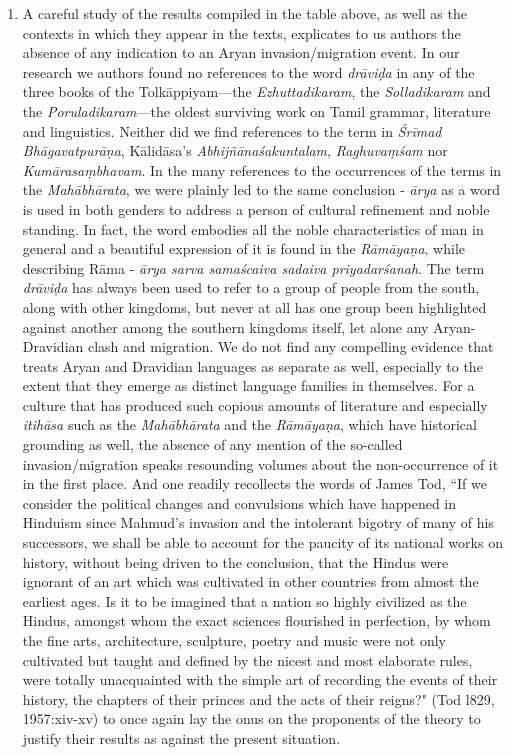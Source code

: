 \begin{enumerate}
\itemsep=0pt
\item A careful study of the results compiled in the table above, as well as the contexts in which they appear in the texts, explicates to us authors the absence of any indication to an Aryan invasion/migration event. In our research we authors found no references to the word \textit{drāviḍa} in any of the three books of the Tolkāppiyam—the \textit{Ezhuttadikaram}, the \textit{Solladikaram} and the \textit{Poruladikaram}—the oldest surviving work on Tamil grammar, literature and linguistics. Neither did we find references to the term in \textit{Śrīmad Bhāgavatpurāṇa}, Kālidāsa’s \textit{Abhijñānaśakuntalam}, \textit{Raghuvaṃśam} nor \textit{Kumārasaṃbhavam}. In the many references to the occurrences of the terms in the \textit{Mahābhārata}, we were plainly led to the same conclusion - \textit{ārya} as a word is used in both genders to address a person of cultural refinement and noble standing. In fact, the word embodies all the noble characteristics of man in general and a beautiful expression of it is found in the \textit{Rāmāyaṇa}, while describing Rāma -\textit{ ārya sarva samaścaiva sadaiva priyadarśanah}. The term \textit{drāviḍa} has always been used to refer to a group of people from the south, along with other kingdoms, but never at all has one group been highlighted against another among the southern kingdoms itself, let alone any Aryan-Dravidian clash and migration. We do not find any compelling evidence that treats Aryan and Dravidian languages as separate as well, especially to the extent that they emerge as distinct language families in themselves. For a culture that has produced such copious amounts of literature and especially \textit{itihāsa} such as the \textit{Mahābhārata} and the \textit{Rāmāyaṇa}, which have historical grounding as well, the absence of any mention of the so-called invasion/migration speaks resounding volumes about the non-occurrence of it in the first place. And one readily recollects the words of James Tod, “If we consider the political changes and convulsions which have happened in Hinduism since Mahmud's invasion and the intolerant bigotry of many of his successors, we shall be able to account for the paucity of its national works on history, without being driven to the conclusion, that the Hindus were ignorant of an art which was cultivated in other countries from almost the earliest ages. Is it to be imagined that a nation so highly civilized as the Hindus, amongst whom the exact sciences flourished in perfection, by whom the fine arts, architecture, sculpture, poetry and music were not only cultivated but taught and defined by the nicest and most elaborate rules, were totally unacquainted with the simple art of recording the events of their history, the chapters of their princes and the acts of their reigns?" (Tod l829, 1957:xiv-xv) to once again lay the onus on the proponents of the theory to justify their results as against the present situation. 


\end{enumerate}
